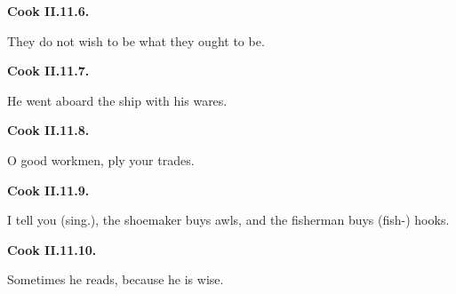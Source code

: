 \par\begin{minipage}{\linewidth}\raggedright
\textbf{Cook II.11.6.}

They do not wish to be what they ought to be.

\end{minipage}\par\addvspace{4pt}

\par\begin{minipage}{\linewidth}\raggedright
\textbf{Cook II.11.7.}

He went aboard the ship with his wares.

\end{minipage}\par\addvspace{4pt}

\par\begin{minipage}{\linewidth}\raggedright
\textbf{Cook II.11.8.}

O good workmen, ply your trades.

\end{minipage}\par\addvspace{4pt}

\par\begin{minipage}{\linewidth}\raggedright
\textbf{Cook II.11.9.}

I tell you (sing.), the shoemaker buys awls, and the fisherman buys (fish-) hooks.

\end{minipage}\par\addvspace{4pt}

\par\begin{minipage}{\linewidth}\raggedright
\textbf{Cook II.11.10.}

Sometimes he reads, because he is wise.

\end{minipage}\par\addvspace{4pt}


